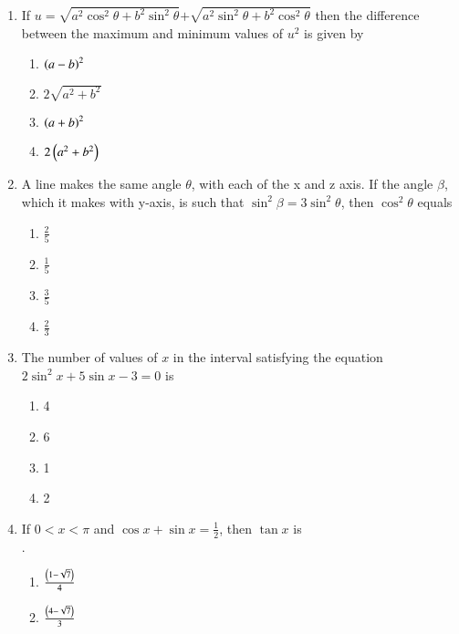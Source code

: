 \documentclass[journal,12pt,twocolumn]{IEEEtran}
\theoremstyle{remark}
\begin{document}
\begin{enumerate}
\item If $u=\sqrt{a^2 \cos^2 \theta+b^2 \sin^2 \theta}$$+$$\sqrt{a^2 \sin^2 \theta+b^2 \cos^2 \theta}$
then the difference between the  maximum and minimum values of $u^2$ is given by \hfill{}
\begin{multicols}{2} 
\begin{enumerate}
\item $\left(a-b\right)^2$
\item $2\sqrt{a^2 +b^2}$
\columnbreak
\item $\left(a+b\right)^2$
\item $2\left(a^2 +b^2\right)$
\end{enumerate} 
\end{multicols}
\item A line makes the same angle $\theta$, with each of the x and z axis. 
If the angle $\beta$, which it makes with y-axis, is such that
$\sin^2 \beta=3\sin^2 \theta$, then $\cos^2 \theta$ equals \hfill{}
\begin{multicols}{2} 
\begin{enumerate}
\item $\frac{2}{5}$
\item $\frac{1}{5}$
\columnbreak
\item $\frac{3}{5}$
\item $\frac{2}{3}$
\end{enumerate} 
\end{multicols}
\item The number of values of $x$ in the interval  satisfying the equation 
\\$2\sin^2 x+5\sin x-3=0$ is \hfill{}
\begin{multicols}{4}
\begin{enumerate}
\item 4
\columnbreak
\item 6
\columnbreak
\item 1
\columnbreak
\item 2
\end{enumerate} 
\end{multicols}
\item If $0<x<\pi$ and $\cos x+\sin x=\frac{1}{2}$, then $\tan x$ is 
\\.\hfill{}
\begin{multicols}{2} 
\begin{enumerate}
\item $\frac{\left(1-\sqrt{7}\right)}{4}$
\item $\frac{\left(4-\sqrt{7}\right)}{3}$

\end{enumerate}
\end{multicols}
\end{enumerate}
\end{document}
